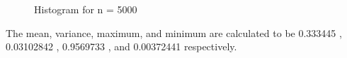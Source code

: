 \documentclass[11pt]{article}
\begin{document}
\begin{figure}[H]
  \centering
    \caption{Histogram for n = 5000}
\end{figure}

The mean, variance, maximum, and minimum are calculated to be 0.333445 , 0.03102842 , 0.9569733 , and 0.00372441 respectively.
\end{document}
